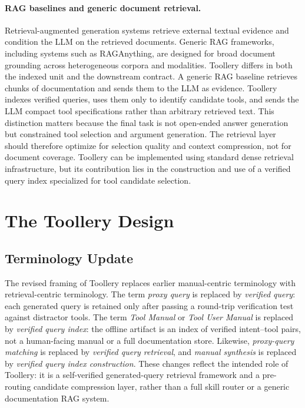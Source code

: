 \paragraph{RAG baselines and generic document retrieval.}
Retrieval-augmented generation systems retrieve external textual evidence and condition the LLM on the retrieved documents. Generic RAG frameworks, including systems such as RAGAnything, are designed for broad document grounding across heterogeneous corpora and modalities. Toollery differs in both the indexed unit and the downstream contract. A generic RAG baseline retrieves chunks of documentation and sends them to the LLM as evidence. Toollery indexes verified queries, uses them only to identify candidate tools, and sends the LLM compact tool specifications rather than arbitrary retrieved text. This distinction matters because the final task is not open-ended answer generation but constrained tool selection and argument generation. The retrieval layer should therefore optimize for selection quality and context compression, not for document coverage. Toollery can be implemented using standard dense retrieval infrastructure, but its contribution lies in the construction and use of a verified query index specialized for tool candidate selection.

\section{The Toollery Design}
\label{sec:method_late_draft}

\subsection{Terminology Update}
\label{subsec:terminology_update}

The revised framing of Toollery replaces earlier manual-centric terminology with retrieval-centric terminology. The term \textit{proxy query} is replaced by \textit{verified query}: each generated query is retained only after passing a round-trip verification test against distractor tools. The term \textit{Tool Manual} or \textit{Tool User Manual} is replaced by \textit{verified query index}: the offline artifact is an index of verified intent--tool pairs, not a human-facing manual or a full documentation store. Likewise, \textit{proxy-query matching} is replaced by \textit{verified query retrieval}, and \textit{manual synthesis} is replaced by \textit{verified query index construction}. These changes reflect the intended role of Toollery: it is a self-verified generated-query retrieval framework and a pre-routing candidate compression layer, rather than a full skill router or a generic documentation RAG system.

